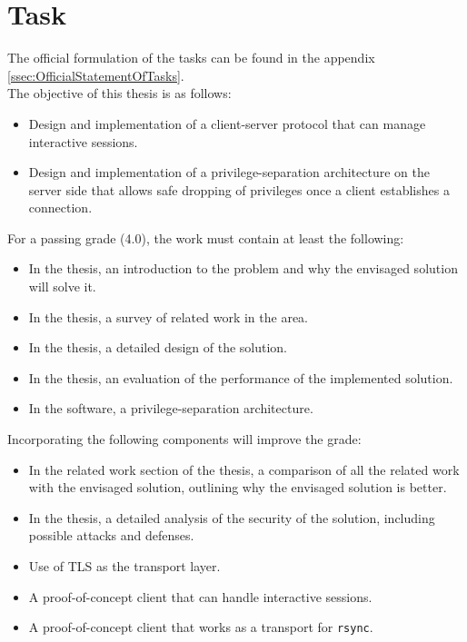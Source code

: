 \documentclass[10pt,a4paper,titlepage,twoside,english,final]{zhawreprt}
\begin{document}
\section{Task}\label{sec:Task}
The official formulation of the tasks can be found in the appendix \ref{ssec:OfficialStatementOfTasks}.\\
The objective of this thesis is as follows:
\begin{itemize}
\item Design and implementation of a client-server protocol that can manage interactive sessions.
\item Design and implementation of a privilege-separation architecture on the server side that allows safe dropping of privileges once a client establishes a connection.
\end{itemize}

For a passing grade (4.0), the work must contain at least the following:
\begin{itemize}
\item In the thesis, an introduction to the problem and why the envisaged solution will solve it.
\item In the thesis, a survey of related work in the area.
\item In the thesis, a detailed design of the solution.
\item In the thesis, an evaluation of the performance of the implemented solution.
\item In the software, a privilege-separation architecture.
\end{itemize}

Incorporating the following components will improve the grade:
\begin{itemize}
\item In the related work section of the thesis, a comparison of all the related work with the envisaged solution, outlining why the envisaged solution is better.
\item In the thesis, a detailed analysis of the security of the solution, including possible attacks and defenses.
\item Use of \gls{TLS} as the transport layer.
\item A proof-of-concept client that can handle interactive sessions.
\item A proof-of-concept client that works as a transport for \texttt{rsync}.
\end{itemize}
\end{document}
